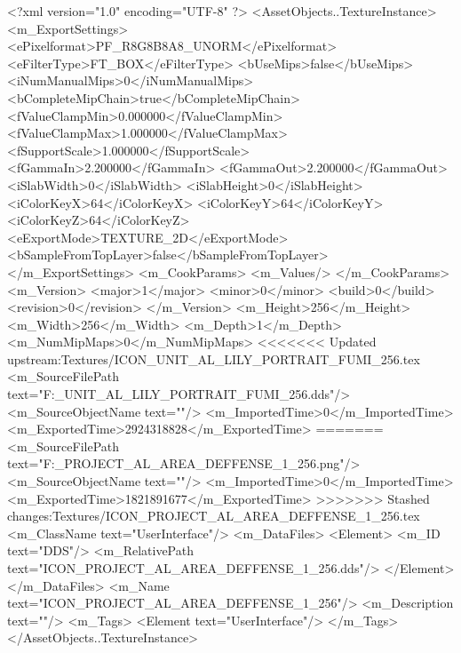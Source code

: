 <?xml version="1.0" encoding="UTF-8" ?>
<AssetObjects..TextureInstance>
	<m_ExportSettings>
		<ePixelformat>PF_R8G8B8A8_UNORM</ePixelformat>
		<eFilterType>FT_BOX</eFilterType>
		<bUseMips>false</bUseMips>
		<iNumManualMips>0</iNumManualMips>
		<bCompleteMipChain>true</bCompleteMipChain>
		<fValueClampMin>0.000000</fValueClampMin>
		<fValueClampMax>1.000000</fValueClampMax>
		<fSupportScale>1.000000</fSupportScale>
		<fGammaIn>2.200000</fGammaIn>
		<fGammaOut>2.200000</fGammaOut>
		<iSlabWidth>0</iSlabWidth>
		<iSlabHeight>0</iSlabHeight>
		<iColorKeyX>64</iColorKeyX>
		<iColorKeyY>64</iColorKeyY>
		<iColorKeyZ>64</iColorKeyZ>
		<eExportMode>TEXTURE_2D</eExportMode>
		<bSampleFromTopLayer>false</bSampleFromTopLayer>
	</m_ExportSettings>
	<m_CookParams>
		<m_Values/>
	</m_CookParams>
	<m_Version>
		<major>1</major>
		<minor>0</minor>
		<build>0</build>
		<revision>0</revision>
	</m_Version>
	<m_Height>256</m_Height>
	<m_Width>256</m_Width>
	<m_Depth>1</m_Depth>
	<m_NumMipMaps>0</m_NumMipMaps>
<<<<<<< Updated upstream:Textures/ICON_UNIT_AL_LILY_PORTRAIT_FUMI_256.tex
	<m_SourceFilePath text="F:\DT\lilyimages\gpportrait\ICON_UNIT_AL_LILY_PORTRAIT_FUMI_256.dds"/>
	<m_SourceObjectName text=""/>
	<m_ImportedTime>0</m_ImportedTime>
	<m_ExportedTime>2924318828</m_ExportedTime>
=======
	<m_SourceFilePath text="F:\DT\lilyimages\all\ICON_PROJECT_AL_AREA_DEFFENSE_1_256.png"/>
	<m_SourceObjectName text=""/>
	<m_ImportedTime>0</m_ImportedTime>
	<m_ExportedTime>1821891677</m_ExportedTime>
>>>>>>> Stashed changes:Textures/ICON_PROJECT_AL_AREA_DEFFENSE_1_256.tex
	<m_ClassName text="UserInterface"/>
	<m_DataFiles>
		<Element>
			<m_ID text="DDS"/>
			<m_RelativePath text="ICON_PROJECT_AL_AREA_DEFFENSE_1_256.dds"/>
		</Element>
	</m_DataFiles>
	<m_Name text="ICON_PROJECT_AL_AREA_DEFFENSE_1_256"/>
	<m_Description text=""/>
	<m_Tags>
		<Element text="UserInterface"/>
	</m_Tags>
</AssetObjects..TextureInstance>

